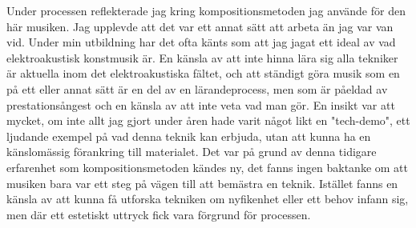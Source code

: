 \documentclass{article}
\begin{document}

Under processen reflekterade jag kring kompositionsmetoden jag använde för den här musiken. Jag upplevde
 att det var ett annat sätt att arbeta än jag var van vid. Under min utbildning har det ofta känts
som att jag jagat ett ideal av vad elektroakustisk konstmusik är. En känsla av att inte hinna lära sig alla
tekniker är aktuella inom det elektroakustiska fältet, och att ständigt göra musik som en på ett eller annat
sätt är en del av en lärandeprocess, men som är påeldad av prestationsångest och en känsla av att inte veta
vad man gör. En insikt var att mycket, om inte allt jag gjort under åren hade varit något likt en "tech-demo",
ett ljudande exempel på vad denna teknik kan erbjuda, utan att kunna ha en känslomässig förankring till
materialet. Det var på grund av denna tidigare erfarenhet som kompositionsmetoden kändes ny, det fanns ingen
baktanke om att musiken bara var ett steg på vägen till att bemästra en teknik. Istället fanns en känsla av
att kunna få utforska tekniken om nyfikenhet eller ett behov infann sig, men där ett estetiskt uttryck fick
vara förgrund för processen. 





\end{document}
